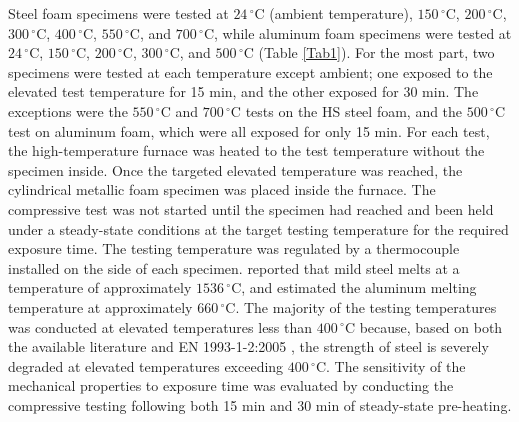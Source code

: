 \documentclass[review]{elsarticle}
\begin{document}
Steel foam specimens were tested at $24\,^{\circ}\mathrm{C}$ (ambient temperature), $150\,^{\circ}\mathrm{C}$, $200\,^{\circ}\mathrm{C}$, $300\,^{\circ}\mathrm{C}$, $400\,^{\circ}\mathrm{C}$, $550\,^{\circ}\mathrm{C}$, and $700\,^{\circ}\mathrm{C}$, while aluminum foam specimens were tested at $24\,^{\circ}\mathrm{C}$, $150\,^{\circ}\mathrm{C}$, $200\,^{\circ}\mathrm{C}$, $300\,^{\circ}\mathrm{C}$, and $500\,^{\circ}\mathrm{C}$ (Table \ref{Tab1}). For the most part, two specimens were tested at each temperature except ambient; one exposed to the elevated test temperature for 15 min, and the other exposed for 30 min. The exceptions were the $550\,^{\circ}\mathrm{C}$ and $700\,^{\circ}\mathrm{C}$ tests on the HS steel foam, and the $500\,^{\circ}\mathrm{C}$ test on aluminum foam, which were all exposed for only 15 min. For each test, the high-temperature furnace was heated to the test temperature without the specimen inside. Once the targeted elevated temperature was reached, the cylindrical metallic foam specimen was placed inside the furnace. The compressive test was not started until the specimen had reached and been held under a steady-state conditions at the target testing temperature for the required exposure time. The testing temperature was regulated by a thermocouple installed on the side of each specimen. \cite{Avalloneetal2007} reported that mild steel melts at a temperature of approximately $1536\,^{\circ}\mathrm{C}$, and \cite{Ashsby2000} estimated the aluminum melting temperature at approximately $660\,^{\circ}\mathrm{C}$. The majority of the testing temperatures was conducted at elevated temperatures less than $400\,^{\circ}\mathrm{C}$  because, based on both the available literature and EN 1993-1-2:2005 \cite{EC3-1-2}, the strength of steel is severely degraded at elevated temperatures exceeding $400\,^{\circ}\mathrm{C}$. The sensitivity of the mechanical properties to exposure time was evaluated by conducting the compressive testing following both 15 min and 30 min of steady-state pre-heating.
\end{document}
